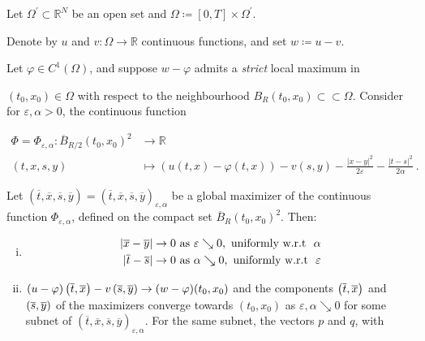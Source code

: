 \begin{lemma}
		 	\label{doubling device}
		 	Let $ \Omega^{\prime} \subset \mathbb{R}^N $ be an open set and $ \Omega \coloneqq \left[0, T\right] \times \Omega^{\prime} $. 
		 	
		 	Denote by $ u $ and $ v : \Omega \to \mathbb{R} $ continuous functions, and set $ w \coloneqq u - v $.
		 	 
		 	Let $ \varphi \in C^{1}(\Omega) $, and suppose $ w - \varphi $ admits a \emph{strict} local maximum in 
		 	
		 	$ (t_0, x_0) \in \Omega $ with respect to the neighbourhood $ B_R(t_0, x_0) \subset \subset \Omega $. Consider for $ \varepsilon, \alpha > 0 $, the continuous function
		 	
		 	\begin{align*}
		 	\Phi = \Phi_{\varepsilon, \alpha} :\overline{B} _{R / 2}(t_0, x_0)^2 &\to \mathbb{R} \\
		 	(t, x, s, y) &\mapsto (u(t, x) - \varphi(t, x)) - v(s, y) - \frac{\lvert x - y \rvert^2 }{2 \varepsilon} - \frac{\lvert t - s \rvert^2}{2 \alpha} \ .
		 	\end{align*}
		 	
		 	Let $ (\overline{t}, \overline{x}, \overline{s}, \overline{y}) = (\overline{t}, \overline{x}, \overline{s}, \overline{y})_{\varepsilon, \alpha} $ be a global maximizer of the continuous function $ \Phi_{\varepsilon, \alpha} $, defined on the compact set $ \overline{B}_R(t_0, x_0)^2 $. Then:
		 	
		 	\begin{enumerate}[(i)]
		 		\item 
		 		\label{distance convergence}
		 		\begin{align*}
		 		\lvert \overline{x} - \overline{y} \rvert &\to 0 \hbox{ as } \varepsilon \searrow 0, \hbox{ uniformly w.r.t } \  \alpha \\
		 		\lvert \overline{t} - \overline{s} \rvert &\to 0 \hbox{ as } \alpha \searrow 0, \hbox{ uniformly w.r.t } \ \varepsilon 
		 		\end{align*}
		 		
		 		\item
		 		\label{maximizer convergence} 
		 		$ (u - \varphi)\left(\overline{t}, \overline{x}\right) - v\left(\overline{s}, \overline{y}\right) \to (w - \varphi)(t_0, x_0) $ and the components $ \left(\overline{t}, \overline{x}\right) $ and $ \left(\overline{s}, \overline{y}\right) $ of the maximizers converge towards $ (t_0, x_0) $ as $ \varepsilon, \alpha \searrow 0 $ for some subnet of $ (\overline{t}, \overline{x}, \overline{s}, \overline{y})_{\varepsilon, \alpha} $. 
		 		For the same subnet, the vectors $ p $ and $ q $, with
		 		

\end{enumerate}
\end{lemma}
